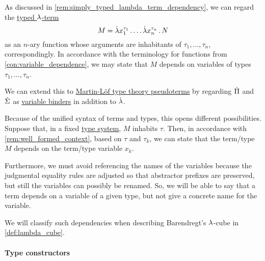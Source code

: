 \begin{remark}\label{rem:mltt_pseudoterm_dependency}
  As discussed in \cref{rem:simply_typed_lambda_term_dependency}, we can regard the \hyperref[def:typed_lambda_term]{typed \( {\mathrm \lambda} \)-term}
  \begin{equation*}
    M = \qabs {x_1^{\tau_1}}\ldots \qabs {x_n^{\tau_n}} N
  \end{equation*}
  as an \( n \)-ary function whose arguments are inhabitants of \( \tau_1, \ldots, \tau_n \), correspondingly. In accordance with the terminology for functions from \cref{con:variable_dependence}, we may state that \( M \) depends on variables of types \( \tau_1, \ldots, \tau_n \).

  We can extend this to \hyperref[rem:pseudoterm_schemas]{Martin-L\"of type theory pseudoterms} by regarding \( \dot{\Pi} \) and \( \dot{\Sigma} \) as \hyperref[con:variable_binding]{variable binders} in addition to \( \mathord{\dot{{\mathrm \lambda}}} \).

  Because of the unified syntax of terms and types, this opens different possibilities. Suppose that, in a fixed \hyperref[def:abstract_type_system]{type system}, \( M \) inhabits \( \tau \). Then, in accordance with \cref{rem:well_formed_context}, based on \( \tau \) and \( \tau_k \), we can state that the term/type \( M \) depends on the term/type variable \( x_k \).

  Furthermore, we must avoid referencing the names of the variables because the judgmental equality rules are adjusted so that abstractor prefixes are preserved, but still the variables can possibly be renamed. So, we will be able to say that a term depends on a variable of a given type, but not give a concrete name for the variable.

  We will classify such dependencies when describing Barendregt's \( {\mathrm \lambda} \)-cube in \cref{def:lambda_cube}.
\end{remark}

\paragraph{Type constructors}


